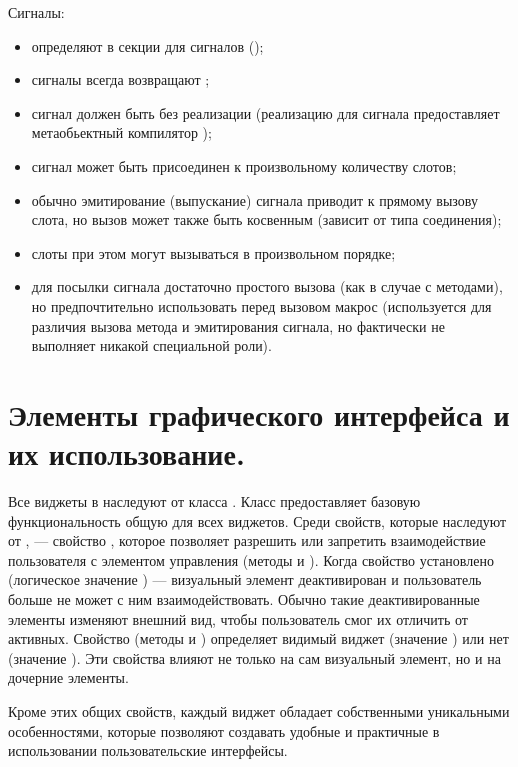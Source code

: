 Сигналы:
\begin{itemize}
\item определяют в секции для сигналов ();
\item сигналы всегда возвращают ;
\item сигнал должен быть без реализации (реализацию для сигнала предоставляет метаобьектный компилятор );
\item сигнал может быть присоединен к произвольному количеству слотов;
\item обычно эмитирование (выпускание) сигнала приводит к прямому вызову слота, но вызов может также быть косвенным
(зависит от типа соединения);
\item слоты при этом могут вызываться в произвольном порядке;
\item для посылки сигнала достаточно простого вызова (как в случае с методами), но предпочтительно использовать перед
вызовом макрос  (используется для различия вызова метода и эмитирования сигнала, но фактически не
выполняет никакой специальной роли).
\end{itemize}

\section[Элементы графического интерфейса.]{Элементы графического интерфейса и их использование.
}
Все виджеты в  наследуют от класса . Класс  предоставляет базовую
функциональность общую для всех виджетов. Среди свойств, которые наследуют от , --- свойство
, которое позволяет разрешить или запретить взаимодействие пользователя с элементом управления (методы
 и ). Когда свойство установлено (логическое значение
) --- визуальный элемент деактивирован и пользователь больше не может с ним взаимодействовать. Обычно такие
деактивированные элементы изменяют внешний вид, чтобы пользователь смог их отличить от активных. Свойство
 (методы  и ) определяет видимый виджет
(значение ) или нет (значение ). Эти свойства влияют не только на сам визуальный элемент, но
и на дочерние элементы.

Кроме этих общих свойств, каждый виджет обладает собственными уникальными особенностями, которые позволяют создавать
удобные и практичные в использовании пользовательские интерфейсы.

